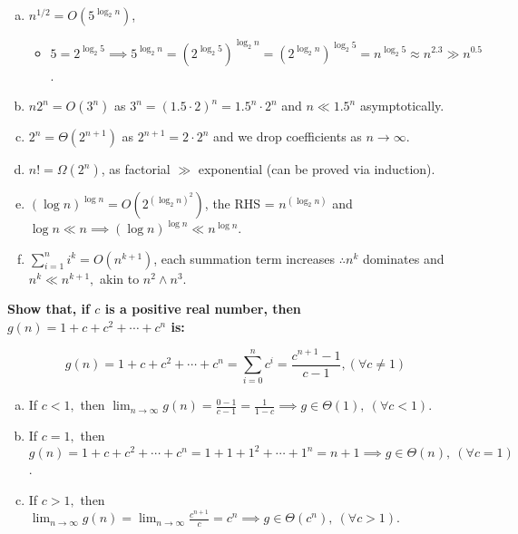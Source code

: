 \begin{problem}{0.1}
\begin{enumerate}[(a)]
        \item $n^{1/2}=O(5^{\log_2 n})$, 
            \begin{itemize}
                \item $5=2^{\log_2 5}\implies5^{\log_2 n}
                    =(2^{\log_2 5})^{\log_2 n}
                    =(2^{\log_2 n})^{\log_2 5}
                    =n^{\log_2 5}\approx n^{2.3}\gg n^{0.5}$.
            \end{itemize}
        \item $n2^n=O(3^n)$ as $3^n = (1.5 \cdot 2)^n = 1.5^n \cdot 2^n$ and $n\ll 1.5^n$ asymptotically.
        \item $2^n=\Theta(2^{n+1})$ as $2^{n+1}=2\cdot2^{n}$ and we drop coefficients as $n\to\infty$.
        \item $n!=\Omega(2^n)$, as factorial $\gg$ exponential (can be proved via induction).
        \item $(\log n)^{\log n}=O(2^{{(\log_2 n)}^2})$, the RHS = $n^{(\log_2 n)}$ and $\log n\ll n
        \implies
        (\log n)^{\log n}\ll n^{\log n}$.
        \item $\displaystyle\sum_{i=1}^n i^k = O(n^{k+1})$, each summation term increases $\therefore n^k$ dominates and $n^k\ll n^{k+1},$ akin to $n^2\land n^3$.
    \end{enumerate}
\end{problem}

\newpage
\begin{problem}{0.2}
    \textbf{Show that, if $c$ is a positive real number, then $g(n) = 1 + c + c^2 + \cdots + c^n$ is:}

    \[
        g(n) 
        = 1 + c + c^2 + \cdots + c^n 
        = \displaystyle\sum_{i=0}^n c^i
        = \frac{c^{n+1}-1}{c-1}, 
        (\forall c\neq 1)
    \]

    \begin{enumerate}[(a)]
        \item If $c<1,$ 
        then $\displaystyle\lim_{n\to\infty}g(n)
        =\frac{0-1}{c-1}
        =\frac{1}{1-c}
        \implies \boxed{g\in\Theta(1),} \  (\forall c < 1)$.
        \item If $c=1,$ 
        then $g(n) 
        = 1 + c + c^2 + \cdots + c^n
        = 1 + 1 + 1^2 + \cdots + 1^n
        = n + 1
        \implies \boxed{g\in\Theta(n),} \  (\forall c=1)$.
        \item If $c>1,$ 
        then $\displaystyle\lim_{n\to\infty}g(n)
        =\lim_{n\to\infty}\frac{c^{n+1}}{c}
        = c^n
        \implies \boxed{g\in\Theta(c^n),} \  (\forall c > 1)$.
    \end{enumerate}
\end{problem}

